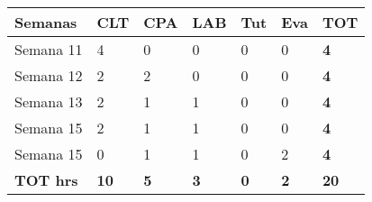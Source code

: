\documentclass[11pt]{article}
\begin{document}
    \begin{longtable}[]{@{}lllllll@{}}
\toprule
\textbf{Semanas} & \textbf{CLT} & \textbf{CPA} & \textbf{LAB} &
\textbf{Tut} & \textbf{Eva} & \textbf{TOT}\tabularnewline
\midrule
\endhead
Semana 11 & 4 & 0 & 0 & 0 & 0 & \textbf{4}\tabularnewline
Semana 12 & 2 & 2 & 0 & 0 & 0 & \textbf{4}\tabularnewline
Semana 13 & 2 & 1 & 1 & 0 & 0 & \textbf{4}\tabularnewline
Semana 15 & 2 & 1 & 1 & 0 & 0 & \textbf{4}\tabularnewline
Semana 15 & 0 & 1 & 1 & 0 & 2 & \textbf{4}\tabularnewline
\textbf{TOT hrs} & \textbf{10} & \textbf{5} & \textbf{3} & \textbf{0} &
\textbf{2} & \textbf{20}\tabularnewline
\bottomrule
\end{longtable}

    


    
    
    
    
\end{document}
